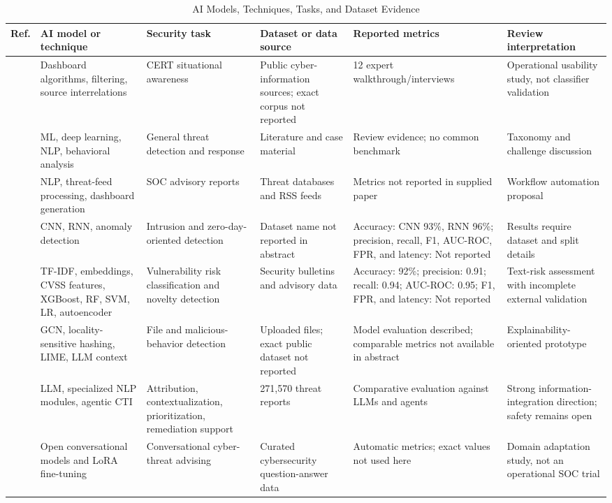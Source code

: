 \documentclass[conference]{IEEEtran}
\begin{document}
\begin{table}[t]
\caption{AI Models, Techniques, Tasks, and Dataset Evidence}
\label{tab:models}
\centering\scriptsize
\begin{tabularx}{\textwidth}{c Y Y Y Y Y}
\toprule
Ref. & AI model or technique & Security task & Dataset or data source & Reported metrics & Review interpretation\\
\midrule
\cite{Kaufhold2022} & Dashboard algorithms, filtering, source interrelations & CERT situational awareness & Public cyber-information sources; exact corpus not reported & 12 expert walkthrough/interviews & Operational usability study, not classifier validation\\
\cite{Manoharan2022} & ML, deep learning, NLP, behavioral analysis & General threat detection and response & Literature and case material & Review evidence; no common benchmark & Taxonomy and challenge discussion\\
\cite{Abeywardena2023} & NLP, threat-feed processing, dashboard generation & SOC advisory reports & Threat databases and RSS feeds & Metrics not reported in supplied paper & Workflow automation proposal\\
\cite{Rajendran2024} & CNN, RNN, anomaly detection & Intrusion and zero-day-oriented detection & Dataset name not reported in abstract & Accuracy: CNN 93\%, RNN 96\%; precision, recall, F1, AUC-ROC, FPR, and latency: Not reported & Results require dataset and split details\\
\cite{KumarBhatRisk} & TF-IDF, embeddings, CVSS features, XGBoost, RF, SVM, LR, autoencoder & Vulnerability risk classification and novelty detection & Security bulletins and advisory data & Accuracy: 92\%; precision: 0.91; recall: 0.94; AUC-ROC: 0.95; F1, FPR, and latency: Not reported & Text-risk assessment with incomplete external validation\\
\cite{Balaji2025} & GCN, locality-sensitive hashing, LIME, LLM context & File and malicious-behavior detection & Uploaded files; exact public dataset not reported & Model evaluation described; comparable metrics not available in abstract & Explainability-oriented prototype\\
\cite{Liu2025} & LLM, specialized NLP modules, agentic CTI & Attribution, contextualization, prioritization, remediation support & 271,570 threat reports & Comparative evaluation against LLMs and agents & Strong information-integration direction; safety remains open\\
\cite{Zhivonitko2026} & Open conversational models and LoRA fine-tuning & Conversational cyber-threat advising & Curated cybersecurity question-answer data & Automatic metrics; exact values not used here & Domain adaptation study, not an operational SOC trial\\

\end{tabularx}
\end{table}
\end{document}

